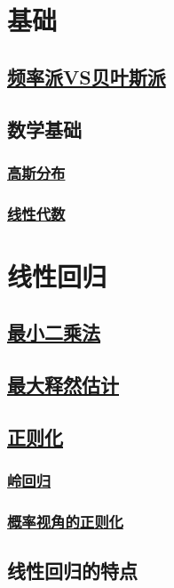 \documentclass[11pt]{article}
\author{hyliu}
\date{\today}
\title{}
\begin{document}
\tableofcontents

\section{基础}
\label{sec:orga260cf5}
\subsection{\href{频率派VS贝叶斯派.org}{频率派VS贝叶斯派}}
\label{sec:org3491100}
\subsection{数学基础}
\label{sec:orgb166ea1}
\subsubsection{\href{高斯分布.org}{高斯分布}}
\label{sec:org2a5f9b5}
\subsubsection{\href{线性代数内容.org}{线性代数}}
\label{sec:org260a4a1}
\section{线性回归}
\label{sec:orgf822865}
\subsection{\href{线性回归.md}{最小二乘法}}
\label{sec:org5732098}
\subsection{\href{线性回归.md}{最大释然估计}}
\label{sec:orga29245b}
\subsection{\href{线性回归.md}{正则化}}
\label{sec:org0017be6}
\subsubsection{\href{线性回归.md}{岭回归}}
\label{sec:org0f4a600}
\subsubsection{\href{线性回归.md}{概率视角的正则化}}
\label{sec:orgafff404}

\subsection{线性回归的特点}
\label{sec:org9869aeb}
\end{document}
